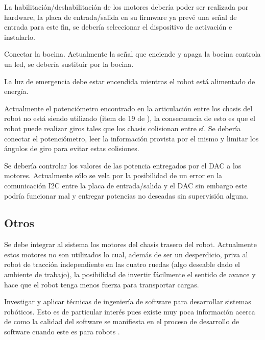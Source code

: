 \documentclass[withindex,glossary]{cam-thesis}
\begin{document}
La habilitación/deshabilitación de los motores debería poder ser realizada por hardware, la placa de entrada/salida en su firmware ya prevé una señal de entrada para este fin, se debería seleccionar el dispositivo de activación e instalarlo.

Conectar la bocina. Actualmente la señal que enciende y apaga la bocina controla un led, se debería sustituir por la bocina. 

La luz de emergencia debe estar encendida mientras el robot está alimentado de energía.

Actualmente el potenciómetro encontrado en la articulación entre los chasis del robot no está siendo utilizado (item de 19 de \cite{fig:PrototipoDM33}), la consecuencia de esto es que el robot puede realizar giros tales que los chasis colisionan entre sí. Se debería conectar el potenciómetro, leer la información provista por el mismo y limitar los ángulos de giro para evitar estas colisiones.

Se debería controlar los valores de las potencia entregados por el DAC a los motores. Actualmente sólo se vela por la posibilidad de un error en la comunicación I2C entre la placa de entrada/salida y el DAC sin embargo este podría funcionar mal y entregar potencias no deseadas sin supervisión alguna.

\subsection{Otros}
Se debe integrar al sistema los motores del chasis trasero del robot. Actualmente estos motores no son utilizados lo cual, además de ser un desperdicio, priva al robot de tracción independiente en las cuatro ruedas (algo deseable dado el ambiente de trabajo), la posibilidad de invertir fácilmente el sentido de avance y hace que el robot tenga menos fuerza para transportar cargas.

Investigar y aplicar técnicas de ingeniería de software para desarrollar sistemas robóticos. Esto es de particular interés pues existe muy poca información acerca de como la calidad del software se manifiesta en el proceso de desarrollo de software cuando este es para robots \cite{safetycertificationpractices}.

\end{document}
